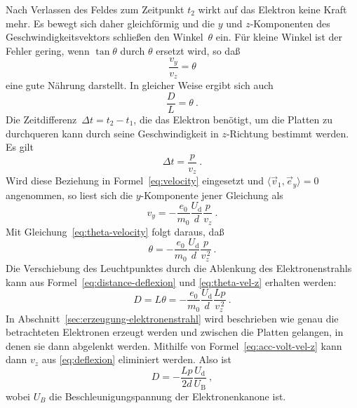 Nach Verlassen des Feldes zum Zeitpunkt $t_2$ wirkt auf das Elektron
keine Kraft mehr. Es bewegt sich daher gleichförmig und die $y$ und
$z$-Komponenten des Geschwindigkeitsvektors schließen den
Winkel~$\theta$ ein. Für kleine Winkel ist der Fehler gering, wenn
$\tan\theta$ durch $\theta$ ersetzt wird, so daß
%
\begin{equation}
  \label{eq:theta-velocity}
  \frac{v_y}{v_z} = \theta
\end{equation}
%
eine gute Nährung darstellt. In gleicher Weise ergibt sich  auch
%
\begin{equation}
  \label{eq:distance-deflexion}
  \frac{D}{L} = \theta \:.
\end{equation}
%
Die Zeitdifferenz~$\Delta t = t_2-t_1$, die das Elektron benötigt, um
die Platten zu durchqueren kann durch seine Geschwindigkeit in
$z$-Richtung bestimmt werden. Es gilt
%
\begin{equation}
  \Delta t = \frac{p}{v_z} \:.
\end{equation}
%
Wird diese Beziehung in Formel~\eqref{eq:velocity} eingesetzt und
$\langle\vec{v}_1,\vec{e}_y\rangle = 0$ angenommen, so
liest sich die $y$-Komponente jener Gleichung als
%
\begin{equation}
  \label{eq:vel-y-vel-z}
  v_y = - \frac{e_0}{m_0}\frac{U_\text{d}}{d} \frac{p}{v_z} \:.
\end{equation}
%
Mit Gleichung~\eqref{eq:theta-velocity} folgt daraus, daß
%
\begin{equation}
  \label{eq:theta-vel-z}
  \theta = - \frac{e_0}{m_0}\frac{U_\text{d}}{d} \frac{p}{v_z^{\,2}} \:.
\end{equation}
%
Die Verschiebung des Leuchtpunktes durch die Ablenkung des
Elektronenstrahls kann aus Formel~\eqref{eq:distance-deflexion} und
\eqref{eq:theta-vel-z} erhalten werden:
%
\begin{equation}
  \label{eq:deflexion}
  D = L\theta = - \frac{e_0}{m_0}\frac{U_\text{d}}{d} \frac{Lp}{v_z^{\,2}} \:.
\end{equation}
%
In Abschnitt~\ref{sec:erzeugung-elektronenstrahl} wird beschrieben wie
genau die betrachteten Elektronen erzeugt werden und zwischen die
Platten gelangen, in denen sie dann abgelenkt werden. Mithilfe von
Formel~\eqref{eq:acc-volt-vel-z} kann dann $v_z$ aus
\eqref{eq:deflexion} eliminiert werden. Also ist
%
\begin{equation}
  D = - \frac{Lp}{2d} \frac{U_\text{d}}{U_\text{B}} \:,
\end{equation}
%
wobei $U_B$ die Beschleunigungspannung der Elektronenkanone ist.

